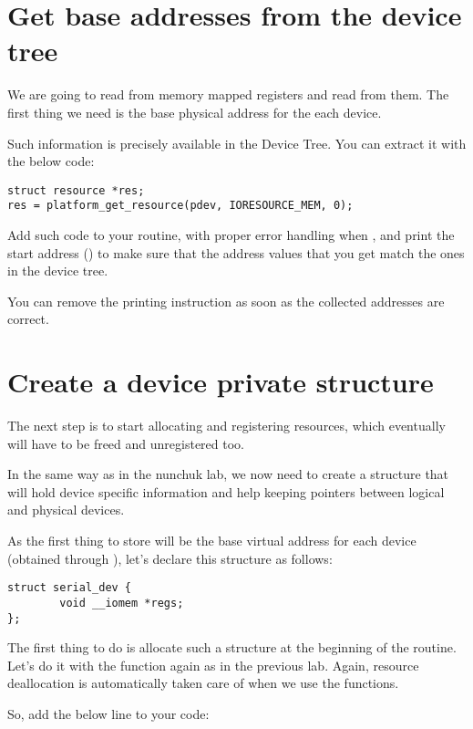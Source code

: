 \section{Get base addresses from the device tree}

We are going to read from memory mapped registers and read from them.
The first thing we need is the base physical address for the each
device.

Such information is precisely available in the Device Tree. You can
extract it with the below code:

\begin{verbatim}
struct resource *res;
res = platform_get_resource(pdev, IORESOURCE_MEM, 0);
\end{verbatim}

Add such code to your  routine, with proper error
handling when , and print the start address
() to make sure that the address values that
you get match the ones in the device tree.

You can remove the printing instruction as soon as the collected
addresses are correct.

\section{Create a device private structure}

The next step is to start allocating and registering resources,
which eventually will have to be freed and unregistered too.

In the same way as in the nunchuk lab, we now need to create a
structure that will hold device specific information and help
keeping pointers between logical and physical devices.

As the first thing to store will be the base virtual address for
each device (obtained through ), let's declare this
structure as follows:

\begin{verbatim}
struct serial_dev {
        void __iomem *regs;
};
\end{verbatim}

The first thing to do is allocate such a structure at the beginning
of the  routine. Let's do it with the 
function again as in the previous lab. Again, resource deallocation is
automatically taken care of when we use the  functions.

So, add the below line to your code:

